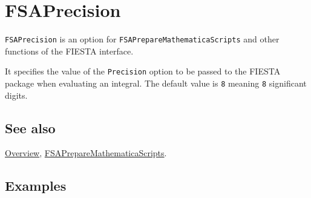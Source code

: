 \documentclass[../FeynHelpersManual.tex]{subfiles}
\begin{document}
\begin{Shaded}
\begin{Highlighting}[]
 
\end{Highlighting}
\end{Shaded}

\hypertarget{fsaprecision}{
\section{FSAPrecision}\label{fsaprecision}}

\texttt{FSAPrecision} is an option for
\texttt{FSAPrepareMathematicaScripts} and other functions of the FIESTA
interface.

It specifies the value of the \texttt{Precision} option to be passed to
the FIESTA package when evaluating an integral. The default value is
\texttt{8} meaning \texttt{8} significant digits.

\subsection{See also}

\hyperlink{toc}{Overview},
\hyperlink{fsapreparemathematicascripts}{FSAPrepareMathematicaScripts}.

\subsection{Examples}
\end{document}
